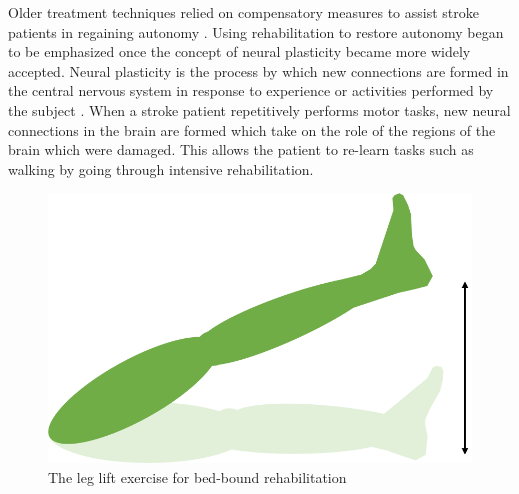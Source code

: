 \documentclass[12pt]{report}
\begin{document}

Older treatment techniques relied on compensatory measures to assist stroke patients in regaining autonomy \cite{Dobkin2004}. Using rehabilitation to restore autonomy began to be emphasized once the concept of neural plasticity became more widely accepted. Neural plasticity is the process by which new connections are formed in the central nervous system in response to experience or activities performed by the subject \cite{Warraich2010}. When a stroke patient repetitively performs motor tasks, new neural connections in the brain are formed which take on the role of the regions of the brain which were damaged. This allows the patient to re-learn tasks such as walking by going through intensive rehabilitation. 

	\begin{figure}[h] 
		\centering
		\includegraphics[width=0.6\linewidth]{leg_lift}
		\caption{The leg lift exercise for bed-bound rehabilitation}
		\label{fig:leg_lift}
	\end{figure}
	
\end{document}
